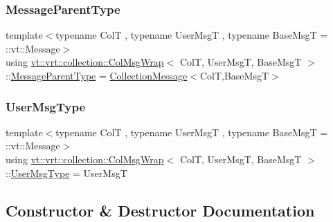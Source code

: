 \subsubsection{\texorpdfstring{Message\+Parent\+Type}{MessageParentType}}
{\footnotesize\ttfamily template$<$typename ColT , typename User\+MsgT , typename Base\+MsgT  = \+::vt\+::\+Message$>$ \\
using \hyperlink{structvt_1_1vrt_1_1collection_1_1_col_msg_wrap}{vt\+::vrt\+::collection\+::\+Col\+Msg\+Wrap}$<$ ColT, User\+MsgT, Base\+MsgT $>$\+::\hyperlink{structvt_1_1location_1_1_entity_msg_a186637100a628eb04cb00127f5579210}{Message\+Parent\+Type} =  \hyperlink{structvt_1_1vrt_1_1collection_1_1_collection_message}{Collection\+Message}$<$ColT,Base\+MsgT$>$}

\mbox{\label{structvt_1_1vrt_1_1collection_1_1_col_msg_wrap_a168446c6b2feea3a003dbfa02f21e227}} 
\subsubsection{\texorpdfstring{User\+Msg\+Type}{UserMsgType}}
{\footnotesize\ttfamily template$<$typename ColT , typename User\+MsgT , typename Base\+MsgT  = \+::vt\+::\+Message$>$ \\
using \hyperlink{structvt_1_1vrt_1_1collection_1_1_col_msg_wrap}{vt\+::vrt\+::collection\+::\+Col\+Msg\+Wrap}$<$ ColT, User\+MsgT, Base\+MsgT $>$\+::\hyperlink{structvt_1_1vrt_1_1collection_1_1_collection_message_ace5b4eaa94f5b209ae321edd6c0b6c19}{User\+Msg\+Type} =  User\+MsgT}



\subsection{Constructor \& Destructor Documentation}
\mbox{\label{structvt_1_1vrt_1_1collection_1_1_col_msg_wrap_a341d1ea25fb9181d1c06ab66df1478f9}} 
